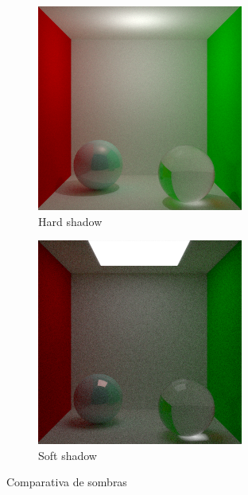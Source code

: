 \documentclass{article}
\begin{document}
\begin{figure}[H]
\begin{subfigure}[h]{0.4\linewidth}
\includegraphics[width=\linewidth]{imgs/hard.png}
\caption{Hard shadow}
\end{subfigure}
\hfill
\begin{subfigure}[h]{0.4\linewidth}
\includegraphics[width=\linewidth]{imgs/soft.png}
\caption{Soft shadow}
\end{subfigure}
\caption{Comparativa de sombras}
\end{figure}
\end{document}
